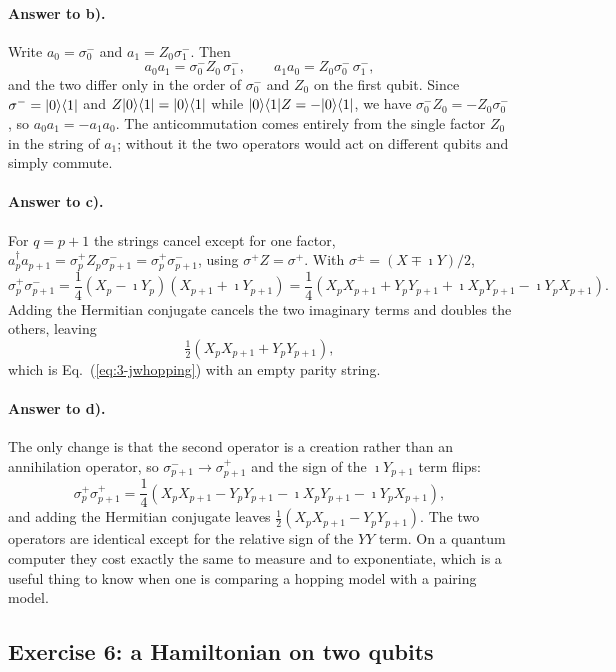 \paragraph{Answer to b).}
Write $a_0=\sigma_0^{-}$ and $a_1=Z_0\sigma_1^{-}$.  Then
\[
  a_0a_1 = \sigma_0^{-}Z_0\,\sigma_1^{-},
  \qquad
  a_1a_0 = Z_0\sigma_0^{-}\,\sigma_1^{-},
\]
and the two differ only in the order of $\sigma_0^{-}$ and $Z_0$ on the first
qubit.  Since $\sigma^{-}=\vert 0 \rangle\langle 1 \vert$ and $Z\vert 0 \rangle\langle 1 \vert=\vert 0 \rangle\langle 1 \vert$
while $\vert 0 \rangle\langle 1 \vert Z=-\vert 0 \rangle\langle 1 \vert$, we have $\sigma_0^{-}Z_0=
-Z_0\sigma_0^{-}$, so $a_0a_1=-a_1a_0$.  The anticommutation comes entirely
from the single factor $Z_0$ in the string of $a_1$; without it the two
operators would act on different qubits and simply commute.

\paragraph{Answer to c).}
For $q=p+1$ the strings cancel except for one factor,
$a_p^{\dagger}a_{p+1}=\sigma_p^{+}Z_p\sigma_{p+1}^{-}=\sigma_p^{+}
\sigma_{p+1}^{-}$, using $\sigma^{+}Z=\sigma^{+}$.  With
$\sigma^{\pm}=(X\mp\imath Y)/2$,
\[
  \sigma_p^{+}\sigma_{p+1}^{-}
   = \frac14\left(X_p-\imath Y_p\right)\left(X_{p+1}+\imath Y_{p+1}\right)
   = \frac14\left(X_pX_{p+1}+Y_pY_{p+1}
     +\imath X_pY_{p+1}-\imath Y_pX_{p+1}\right).
\]
Adding the Hermitian conjugate cancels the two imaginary terms and doubles
the others, leaving
\[
  \tfrac12\left(X_pX_{p+1}+Y_pY_{p+1}\right),
\]
which is Eq.~(\ref{eq:3-jwhopping}) with an empty parity string.

\paragraph{Answer to d).}
The only change is that the second operator is a creation rather than an
annihilation operator, so $\sigma^{-}_{p+1}\to\sigma^{+}_{p+1}$ and the sign
of the $\imath Y_{p+1}$ term flips:
\[
  \sigma_p^{+}\sigma_{p+1}^{+}
   = \frac14\left(X_pX_{p+1}-Y_pY_{p+1}
     -\imath X_pY_{p+1}-\imath Y_pX_{p+1}\right),
\]
and adding the Hermitian conjugate leaves
$\tfrac12(X_pX_{p+1}-Y_pY_{p+1})$.  The two operators are identical except
for the relative sign of the $YY$ term.  On a quantum computer they cost
exactly the same to measure and to exponentiate, which is a useful thing to
know when one is comparing a hopping model with a pairing model.

\subsection*{Exercise 6: a Hamiltonian on two qubits}
\label{ex:3-twoqubit}

